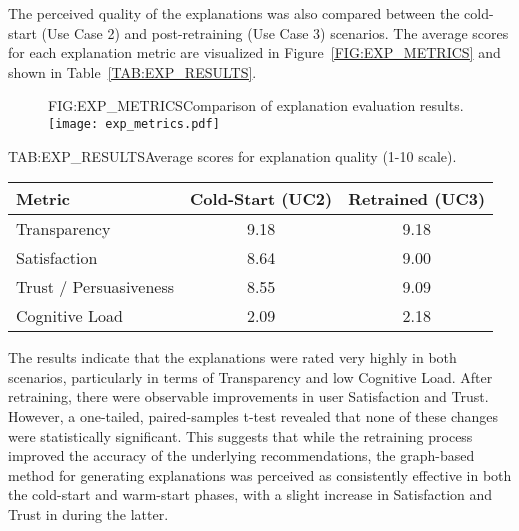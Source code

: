 The perceived quality of the explanations was also compared between the cold-start (Use Case 2) and post-retraining (Use Case 3) scenarios. The average scores for each explanation metric are visualized in Figure~\ref{FIG:EXP_METRICS} and shown in Table~\ref{TAB:EXP_RESULTS}.

\begin{figure}[Explanation Metrics]{FIG:EXP_METRICS}{Comparison of explanation evaluation results.}
    \texttt{[image: exp\_metrics.pdf]}
\end{figure}

\begin{table}[Explanation Quality Scores]{TAB:EXP_RESULTS}{Average scores for explanation quality (1-10 scale).}
    \begin{tabular}{l c c}
        \hline
        \textbf{Metric} & \textbf{Cold-Start (UC2)} & \textbf{Retrained (UC3)} \\
        \hline
        Transparency & 9.18 & 9.18 \\
        Satisfaction & 8.64 & 9.00 \\
        Trust / Persuasiveness & 8.55 & 9.09 \\
        Cognitive Load & 2.09 & 2.18 \\
        \hline
    \end{tabular}
\end{table}

The results indicate that the explanations were rated very highly in both scenarios, particularly in terms of Transparency and low Cognitive Load. After retraining, there were observable improvements in user Satisfaction and Trust. However, a one-tailed, paired-samples t-test revealed that none of these changes were statistically significant. This suggests that while the retraining process improved the accuracy of the underlying recommendations, the graph-based method for generating explanations was perceived as consistently effective in both the cold-start and warm-start phases, with a slight increase in Satisfaction and Trust in during the latter.
